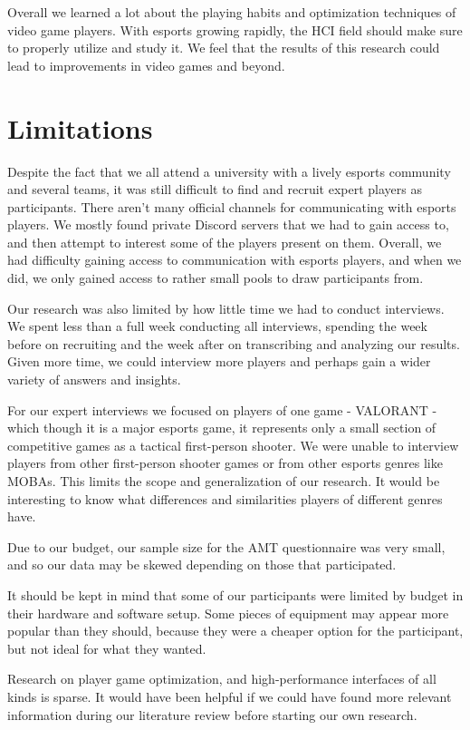 \documentclass[11pt,manuscript,screen,review]{acmart} %
\begin{document}
Overall we learned a lot about the playing habits and optimization techniques of video game players. With esports growing rapidly, the HCI field should make sure to properly utilize and study it. We feel that the results of this research could lead to improvements in video games and beyond. 

\section{Limitations}

Despite the fact that we all attend a university with a lively esports community and several teams, it was still difficult to find and recruit expert players as participants. There aren't many official channels for communicating with esports players. We mostly found private Discord servers that we had to gain access to, and then attempt to interest some of the players present on them. Overall, we had difficulty gaining access to communication with esports players, and when we did, we only gained access to rather small pools to draw participants from.

Our research was also limited by how little time we had to conduct interviews. We spent less than a full week conducting all interviews, spending the week before on recruiting and the week after on transcribing and analyzing our results. Given more time, we could interview more players and perhaps gain a wider variety of answers and insights.

For our expert interviews we focused on players of one game - VALORANT - which though it is a major esports game, it represents only a small section of competitive games as a tactical first-person shooter. We were unable to interview players from other first-person shooter games or from other esports genres like MOBAs. This limits the scope and generalization of our research. It would be interesting to know what differences and similarities players of different genres have.

Due to our budget, our sample size for the AMT questionnaire was very small, and so our data may be skewed depending on those that participated.

It should be kept in mind that some of our participants were limited by budget in their hardware and software setup. Some pieces of equipment may appear more popular than they should, because they were a cheaper option for the participant, but not ideal for what they wanted.

Research on player game optimization, and high-performance interfaces of all kinds is sparse. It would have been helpful if we could have found more relevant information during our literature review before starting our own research.
\end{document}
